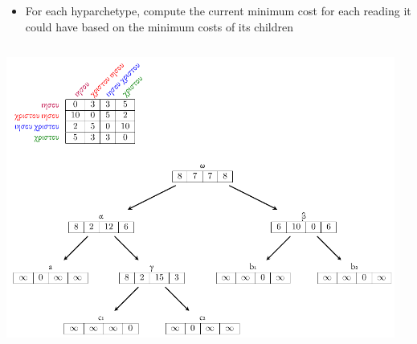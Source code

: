 \documentclass[10pt]{beamer}
\begin{document}
	\begin{frame}
		\begin{itemize}
			\item For each  hyparchetype, compute the current minimum cost for each reading it could have based on the minimum costs of its children
		\end{itemize}
		\begin{columns}[T]
			\begin{column}{0.65\textwidth}
				\includegraphics[scale=0.5]{../img/gene-tree-unrooted-sankoff.pdf}
			\end{column}
			\begin{column}{0.3\textwidth}
\end{column}
\end{columns}
\end{frame}
\end{document}
